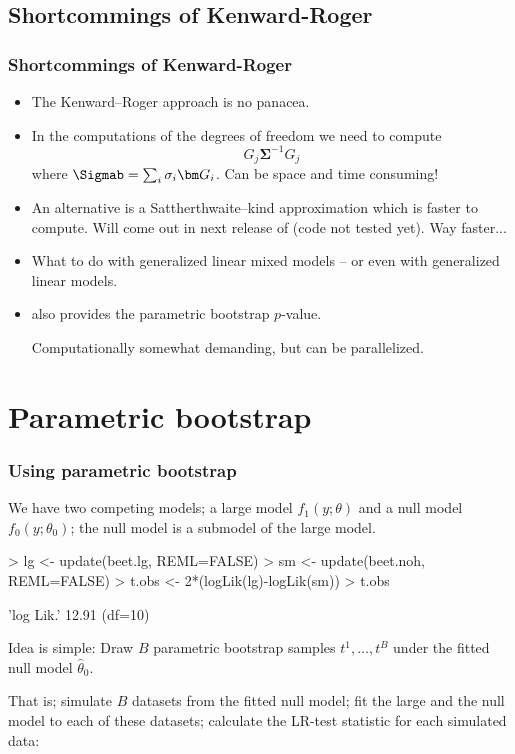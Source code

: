 \subsection{Shortcommings of Kenward-Roger}
\begin{sframe}
\frametitle{Shortcommings of Kenward-Roger}

\begin{itemize}
\item The Kenward--Roger approach is no panacea.
\item In the computations of the degrees of freedom we need to compute
  \begin{displaymath}
    G_j {\bm \Sigma}^{-1} G_j
  \end{displaymath}
  where $\Sigmab= \sum_i \sigma_i \bm G_i$. 
  Can be space and time consuming!
\item An alternative is a Sattherthwaite--kind approximation which is faster to
  compute. Will come out in next release of  (code not tested yet). 
  Way faster...

\item What to do with generalized linear mixed models -- or even
  with generalized linear models.
  
\item 
   also provides the parametric bootstrap $p$-value. 
  
  Computationally somewhat demanding, but can be parallelized. 
\end{itemize}

  
\end{sframe}


\section{Parametric bootstrap}
\label{sec:parametric-bootstrap}
\begin{sframe}
\frametitle{Using parametric bootstrap}

We have two competing models; a large model $f_1(y; \theta)$
and a null model $f_0(y; \theta_0)$; the null model is a submodel of the large model. 

\begin{Schunk}
\begin{Sinput}
> lg <- update(beet.lg, REML=FALSE)
> sm <- update(beet.noh, REML=FALSE)
> t.obs <- 2*(logLik(lg)-logLik(sm))
> t.obs
\end{Sinput}
\begin{Soutput}
'log Lik.' 12.91 (df=10)
\end{Soutput}
\end{Schunk}

Idea is simple: Draw $B$ parametric bootstrap samples
$t^1, \dots, t^B$ under the fitted null model $\hat \theta_0$. 

That is; simulate $B$
datasets from the fitted null model; fit the large and the null model to each of
these datasets; calculate the LR-test statistic for each simulated data:
\end{sframe}

